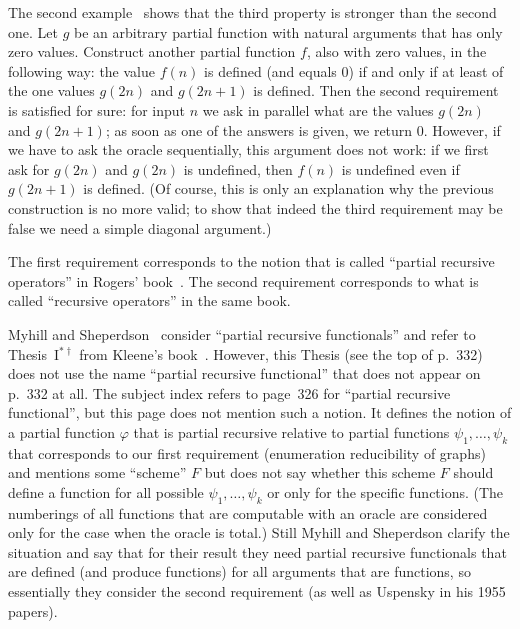 \documentclass[12pt]{article}
\theoremstyle{remark}
\begin{document}
The second example~\cite[Proposition II.3.20, with a reference to Sasso's 1971 thesis]{Odifreddi1989} shows that the third property is stronger than the second one. Let $g$ be an arbitrary partial function with natural arguments that has only zero values. Construct another partial function $f$, also with zero values, in the following way: the value $f(n)$ is defined (and equals $0$) if and only if at least of the one values $g(2n)$ and $g(2n+1)$ is defined. Then the second requirement is satisfied for sure: for input $n$ we ask in parallel what are the values $g(2n)$ and $g(2n+1)$; as soon as one of the answers is given, we return $0$. However, if we have to ask the oracle sequentially, this argument does not work: if we first ask for $g(2n)$ and $g(2n)$ is undefined, then $f(n)$ is undefined even if $g(2n+1)$ is defined. (Of course, this is only an explanation why the previous construction is no more valid; to show that indeed the third requirement may be false we need a simple diagonal argument.)

The first requirement corresponds to the notion that is called ``partial recursive operators'' in Rogers' book~\cite[\S 9.8]{Rogers1972}. The second requirement corresponds to what is called ``recursive operators'' in the same book.

Myhill and Sheperdson~\cite[\S 9.8]{Rogers1972} consider ``partial recursive functionals'' and refer to Thesis~I$^{*\dagger}$ from Kleene's book~\cite[p.~332]{Kleene1957}. However, this Thesis (see the top of p.~332) does not use the name ``partial recursive functional'' that does not appear on p.~332 at all. The subject index refers to page~326 for ``partial recursive functional'', but this page does not mention such a notion. It defines the notion of a partial function $\varphi$ that is partial recursive relative to partial functions $\psi_1,\ldots,\psi_k$ that corresponds to our first requirement (enumeration reducibility of graphs) and mentions some ``scheme'' $F$ but does not say whether this scheme $F$ should define a function for all possible $\psi_1,\ldots,\psi_k$ or only for the specific functions. (The numberings of all functions that are computable with an oracle are considered only for the case when the oracle is total.)  Still Myhill and Sheperdson clarify the situation and say that for their result they need partial recursive functionals that are defined (and produce functions) for all arguments that are functions, so essentially they consider the second requirement (as well as Uspensky in his 1955 papers).
\end{document}
